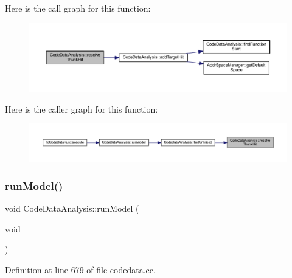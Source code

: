 Here is the call graph for this function\+:
\nopagebreak
\begin{figure}[H]
\begin{center}
\leavevmode
\includegraphics[width=350pt]{class_code_data_analysis_ad565b8a13360e457de73216e3556b583_cgraph}
\end{center}
\end{figure}
Here is the caller graph for this function\+:
\nopagebreak
\begin{figure}[H]
\begin{center}
\leavevmode
\includegraphics[width=350pt]{class_code_data_analysis_ad565b8a13360e457de73216e3556b583_icgraph}
\end{center}
\end{figure}
\mbox{\label{class_code_data_analysis_af2376b45db9a51691d61a95d07220786}} 
\subsubsection{\texorpdfstring{runModel()}{runModel()}}
{\footnotesize\ttfamily void Code\+Data\+Analysis\+::run\+Model (\begin{DoxyParamCaption}\item[{void}]{ }\end{DoxyParamCaption})}



Definition at line 679 of file codedata.\+cc.

